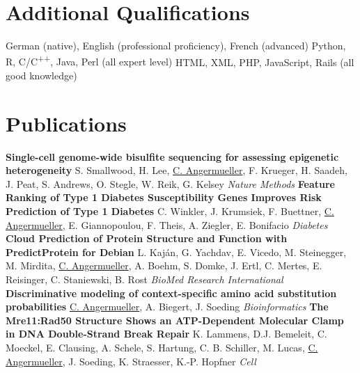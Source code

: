 \documentclass[11pt,a4paper]{moderncv}
\begin{document}
\section{Additional Qualifications}
        {German (native), English (professional proficiency), French (advanced)}
        {Python, R, C/C\textsuperscript{++}, Java, Perl (all expert level)}
        {HTML, XML, PHP, JavaScript, Rails (all good knowledge)}

\section{Publications}
         {\textbf{Single-cell genome-wide bisulfite sequencing for assessing epigenetic heterogeneity}}
         {}
         {\hfill\break S. Smallwood, H. Lee, \underline{C. Angermueller}, F. Krueger, H. Saadeh, J. Peat, S. Andrews, O. Stegle, W. Reik, G. Kelsey}
         {\hfill\break \textit{Nature Methods}}
         {}
         {\textbf{Feature Ranking of Type 1 Diabetes Susceptibility Genes Improves Risk Prediction of Type 1 Diabetes}}
         {}
         {\hfill\break C. Winkler, J. Krumsiek, F. Buettner, \underline{C. Angermueller}, E. Giannopoulou, F. Theis, A. Ziegler, E. Bonifacio}
         {\hfill\break \textit{Diabetes}}
         {}
         {\textbf{Cloud Prediction of Protein Structure and Function with PredictProtein for Debian}}
         {}
         {\hfill\break L. Kaján, G. Yachdav, E. Vicedo, M. Steinegger, M. Mirdita, \underline{C. Angermueller}, A. Boehm, S. Domke, J. Ertl, C. Mertes, E. Reisinger, C. Staniewski, B. Rost}
         {\hfill\break \textit{BioMed Research International}}
         {}
         {\textbf{Discriminative modeling of context-specific amino acid substitution probabilities}}
         {}
         {\hfill\break \underline{C. Angermueller}, A. Biegert, J. Soeding}
         {\hfill\break \textit{Bioinformatics}}
         {}
         {\textbf{The Mre11:Rad50 Structure Shows an ATP-Dependent Molecular Clamp in DNA Double-Strand Break Repair}}
         {}
         {\hfill\break K. Lammens, D.J. Bemeleit, C. Moeckel, E. Clausing, A. Schele, S. Hartung, C. B. Schiller, M. Lucas, \underline{C. Angermueller}, J. Soeding, K. Straesser, K.-P. Hopfner}
         {\hfill\break\textit{Cell}}
         {}
\end{document}
